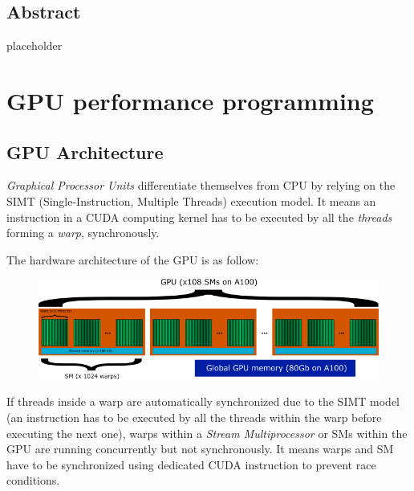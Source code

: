 \documentclass{article}
\begin{document}
\tableofcontents

\vspace{30pt}

\subsection*{Abstract}

placeholder

\newpage

\setcounter{page}{1}
\fancyfoot[R]{\thepage}

\section{GPU performance programming}


\subsection{GPU Architecture}

\textit{Graphical Processor Units} differentiate themselves from CPU by relying on the SIMT (Single-Instruction, Multiple Threads) execution model. It means an instruction in a CUDA computing kernel has to be executed by all the \textit{threads} forming a \textit{warp}, synchronously.

The hardware architecture of the GPU is as follow:

\begin{figure}[H]
\begin{center}
\includegraphics[width=\textwidth]{assets/gpu_arch.png}
\end{center}
\label{fig:gpu_arch}
\end{figure}

If threads inside a warp are automatically synchronized due to the SIMT model (an instruction has to be executed by all the threads within the warp before executing the next one), warps within a \textit{Stream Multiprocessor} or SMs within the GPU are running concurrently but not synchronously. It means warps and SM have to be synchronized using dedicated CUDA instruction to prevent race conditions.
\end{document}

